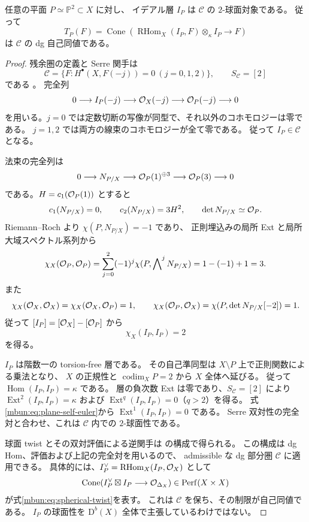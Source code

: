 \begin{lemma}[平面のイデアル層の球面性]
\label{mbun:lem:plane-spherical}
任意の平面 $P\simeq\mathbb P^2\subset X$ に対し、
イデアル層 $I_P$ は $\mathcal C$ の $2$-球面対象である。
従って
\begin{equation}\label{mbun:eq:spherical-twist}
 T_P(F)=
 \operatorname{Cone}\!\left(
   \operatorname{RHom}_X(I_P,F)\otimes_\kappa I_P\longrightarrow F
 \right)
\end{equation}
は $\mathcal C$ の dg 自己同値である。
\end{lemma}
\begin{proof}
残余圏の定義と Serre 関手は
\[
 \mathcal C=
 \{F:H^\bullet(X,F(-j))=0\ (j=0,1,2)\},
 \qquad S_{\mathcal C}=[2]
\]
である \cite[p.~220, (2)--(3)]{NFKuznetsovCubicFourfolds}。
完全列
\[
 0\longrightarrow I_P(-j)\longrightarrow\mathcal O_X(-j)
       \longrightarrow\mathcal O_P(-j)\longrightarrow0
\]
を用いる。$j=0$ では定数切断の写像が同型で、それ以外のコホモロジーは零である。
$j=1,2$ では両方の線束のコホモロジーが全て零である。
従って $I_P\in\mathcal C$ となる。

法束の完全列は
\begin{equation}\label{mbun:eq:plane-normal}
 0\longrightarrow N_{P/X}\longrightarrow\mathcal O_P(1)^{\oplus3}
       \longrightarrow\mathcal O_P(3)\longrightarrow0
\end{equation}
である。$H=c_1(\mathcal O_P(1))$ とすると
\[
 c_1(N_{P/X})=0,\qquad c_2(N_{P/X})=3H^2,\qquad
 \det N_{P/X}\simeq\mathcal O_P .
\]
Riemann--Roch より $\chi(P,N_{P/X})=-1$ であり、
正則埋込みの局所 Ext と局所大域スペクトル系列から
\[
 \chi_X(\mathcal O_P,\mathcal O_P)
 =\sum_{j=0}^2(-1)^j\chi(P,\mathop{\bigwedge}\nolimits^jN_{P/X})
 =1-(-1)+1=3 .
\]
また
\[
 \chi_X(\mathcal O_X,\mathcal O_X)=\chi_X(\mathcal O_X,\mathcal O_P)=1,\qquad
 \chi_X(\mathcal O_P,\mathcal O_X)=\chi(P,\det N_{P/X}[-2])=1 .
\]
従って $[I_P]=[\mathcal O_X]-[\mathcal O_P]$ から
\begin{equation}\label{mbun:eq:plane-self-euler}
 \chi_X(I_P,I_P)=2
\end{equation}
を得る。

$I_P$ は階数一の torsion-free 層である。
その自己準同型は $X\setminus P$ 上で正則関数による乗法となり、
$X$ の正規性と $\operatorname{codim}_X P=2$ から $X$ 全体へ延びる。
従って $\operatorname{Hom}(I_P,I_P)=\kappa$ である。
層の負次数 Ext は零であり、$S_{\mathcal C}=[2]$ により
$\operatorname{Ext}^2(I_P,I_P)=\kappa$ および
$\operatorname{Ext}^q(I_P,I_P)=0$（$q>2$）を得る。
式\eqref{mbun:eq:plane-self-euler}から $\operatorname{Ext}^1(I_P,I_P)=0$ である。
Serre 双対性の完全対と合わせ、これは $\mathcal C$ 内での $2$-球面性である。

球面 twist とその双対評価による逆関手は
\cite[Definition~2.9, Proposition~2.10]{MBUNSeidelThomas}の構成で得られる。
この構成は dg Hom、評価および上記の完全対を用いるので、
admissible な dg 部分圏 $\mathcal C$ に適用できる。
具体的には、$I_P^\vee=\operatorname{RHom}_X(I_P,\mathcal O_X)$ として
\[
 \operatorname{Cone}(I_P^\vee\boxtimes I_P\longrightarrow\mathcal O_{\Delta_X})
       \in\operatorname{Perf}(X\times X)
\]
が式\eqref{mbun:eq:spherical-twist}を表す。
これは $\mathcal C$ を保ち、その制限が自己同値である。
$I_P$ の球面性を $\mathrm D^b(X)$ 全体で主張しているわけではない。
\end{proof}


